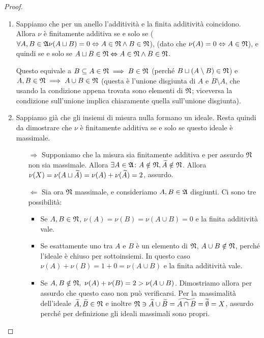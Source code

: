 \documentclass[../EserciziIstituzioniAnalisi.tex]{subfiles}
\begin{document}
\begin{proof}
  \begin{enumerate}
    \item Sappiamo che per un anello l'additività e la finita additività coincidono. Allora $\nu$ è finitamente additiva se e solo se ($\forall A,B\in\mathfrak A \nu(A\sqcup B)=0 \Leftrightarrow A\in\mathfrak N \land B \in \mathfrak N$), (dato che $\nu(A)=0 \Leftrightarrow A\in\mathfrak N$), e quindi se e solo se $A\sqcup B\in\mathfrak N \Leftrightarrow A\in\mathfrak N\land B\in\mathfrak N$.

    Questo equivale a $B\subseteq A\in\mathfrak N\implies B\in\mathfrak N$ (perché $B\sqcup(A\setminus B)\in\mathfrak N$) e $A,B\in\mathfrak N \implies A\cup B\in\mathfrak N$ (questa è l'unione disgiunta di $A$ e $B\setminus A$, che usando la condizione appena trovata sono elementi di $\mathfrak N$; viceversa la condizione sull'unione implica chiaramente quella sull'unione disgiunta).
    \item Sappiamo già che gli insiemi di misura nulla formano un ideale. Resta quindi da dimostrare che $\nu$ è finitamente additiva se e solo se questo ideale è massimale.
    \begin{itemize}
      \item[$\Rightarrow$] Supponiamo che la misura sia finitamente additiva e per assurdo $\mathfrak N$ non sia massimale. Allora $\exists A\in\mathfrak A \colon A\notin \mathfrak N, \widetilde{A}\notin\mathfrak N$. Allora $\nu(X)=\nu(A\sqcup \widetilde{A})=\nu(A)+\nu (\widetilde{A})=2$, assurdo.
      \item[$\Leftarrow$] Sia ora $\mathfrak N$ massimale, e consideriamo $A,B\in\mathfrak A$ disgiunti. Ci sono tre possibilità:
      \begin{itemize}
        \item Se $A,B\in\mathfrak N$, $\nu(A)=\nu(B)=\nu(A \cup B)=0$ e la finita additività vale.
        \item Se esattamente uno tra $A$ e $B$ è un elemento di $\mathfrak N$, $A\cup B \notin \mathfrak N$, perché l'ideale è chiuso per sottoinsiemi. In questo caso $\nu(A)+\nu(B)=1+0=\nu(A \cup B)$ e la finita additività vale.
        \item Se $A,B\notin\gN,\ \nu(A)+\nu(B)=2>\nu(A \cup B)$. Dimostriamo allora per assurdo che questo caso non può verificarsi. Per la massimalità dell'ideale $\widetilde{A},\widetilde{B}\in\mathfrak N$ e  inoltre $\mathfrak N \ni \widetilde{A} \cup \widetilde{B}=\widetilde{A\cap B}=\widetilde{\emptyset}=X$, assurdo perché per definizione gli ideali massimali sono propri.
      \end{itemize}
    \end{itemize}
  \end{enumerate}
\end{proof}
\end{document}
